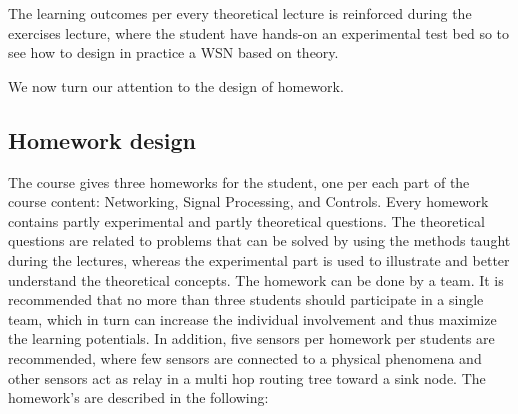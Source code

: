 \documentclass[onecolumn,12pt,draftclsnofoot,a4paper,peerreview]{IEEEtran}
\begin{document}
The learning outcomes per every theoretical lecture is reinforced during the exercises lecture, where the student have hands-on an experimental test bed so to see how to design in practice a WSN based on theory. 

We now turn our attention to the design of homework. 

\subsection{Homework design} \label{subsection:homework}

The course gives three homeworks for the student, one per each part of the course content: Networking, Signal Processing, and Controls. Every homework contains partly experimental and partly theoretical questions. The theoretical questions are related to problems that can be solved by using the methods taught during the lectures, whereas the experimental part is used to illustrate and better understand the theoretical concepts. 
The homework can be done by a team. It is recommended that no more than three students should participate in a single team, which in turn can increase the individual involvement and thus maximize the learning potentials. In addition, five sensors per homework per students are recommended, where few sensors are connected to a physical phenomena and other sensors act as relay in a multi hop routing tree toward a sink node. The homework's are described in the following: 
\end{document}
